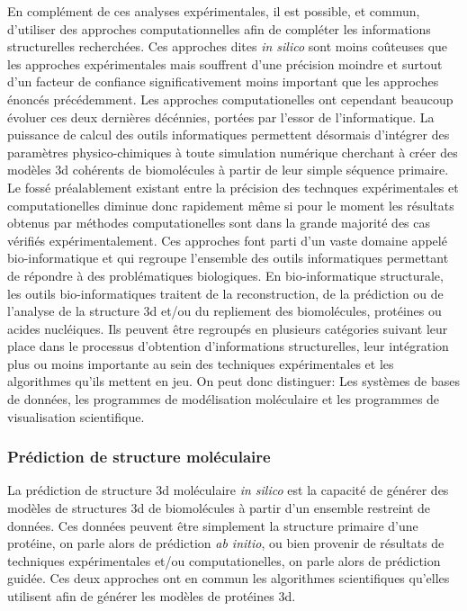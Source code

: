En complément de ces analyses expérimentales, il est possible, et commun, d'utiliser des approches computationnelles afin de compléter les informations structurelles recherchées. Ces approches dites \textit{in silico} sont moins coûteuses que les approches expérimentales mais souffrent d'une précision moindre et surtout d'un facteur de confiance significativement moins important que les approches énoncés précédemment. Les approches computationelles ont cependant beaucoup évoluer ces deux dernières décénnies, portées par l'essor de l'informatique. La puissance de calcul des outils informatiques permettent désormais d'intégrer des paramètres physico-chimiques à toute simulation numérique cherchant à créer des modèles 3d cohérents de biomolécules à partir de leur simple séquence primaire. Le fossé préalablement existant entre la précision des technques expérimentales et computationelles diminue donc rapidement même si pour le moment les résultats obtenus par méthodes computationelles sont dans la grande majorité des cas vérifiés expérimentalement. Ces approches font parti d'un vaste domaine appelé bio-informatique et qui regroupe l'ensemble des outils informatiques permettant de répondre à des problématiques biologiques. En bio-informatique structurale, les outils bio-informatiques traitent de la reconstruction, de la prédiction ou de l'analyse de la structure 3d et/ou du repliement des biomolécules, protéines ou acides nucléiques. Ils peuvent être regroupés en plusieurs catégories suivant leur place dans le processus d'obtention d'informations structurelles, leur intégration plus ou moins importante au sein des techniques expérimentales et les algorithmes qu'ils mettent en jeu. On peut donc distinguer: Les systèmes de bases de données, les programmes de modélisation moléculaire et les programmes de visualisation scientifique.

\subsubsection{Prédiction de structure moléculaire}

La prédiction de structure 3d moléculaire \textit{in silico} est la capacité de générer des modèles de structures 3d de biomolécules à partir d'un ensemble restreint de données. Ces données peuvent être simplement la structure primaire d'une protéine, on parle alors de prédiction \textit{ab initio}, ou bien provenir de résultats de techniques expérimentales et/ou computationelles, on parle alors de prédiction guidée. Ces deux approches ont en commun les algorithmes scientifiques qu'elles utilisent afin de générer les modèles de protéines 3d. 

